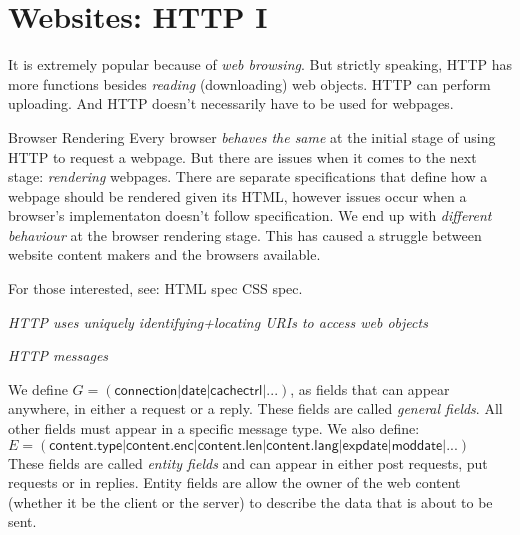 \section{Websites: HTTP I}


It is extremely popular because of \textit{web browsing}. 
But strictly speaking, HTTP has more 
functions besides \textit{reading} (downloading) web objects. 
HTTP can perform uploading. And HTTP doesn't necessarily have 
to be used for webpages. 

\frmrule 


\frmrule 

\begin{sidenote}{Browser Rendering}
Every browser \textit{behaves the same} at the initial stage of 
using HTTP to request a webpage.
But there are issues when it comes to the next stage: \textit{rendering} webpages.  
There are separate specifications that define how a webpage should 
be rendered given its HTML, however issues occur when a browser's 
implementaton doesn't follow specification.
We end up with \textit{different behaviour} at the browser rendering stage.
This has caused a struggle between website content makers and the browsers available. 

For those interested, see: HTML spec CSS spec. 
\end{sidenote}

\frmrule 

\textit{HTTP uses uniquely identifying+locating URIs to \textit{access web objects}}


\frmrule 

\textit{HTTP messages}

We define $G = (\mathsf{connection} | \mathsf{date} | \mathsf{cachectrl} | ... )$, 
as fields that can appear anywhere, in either a request or a reply. 
These fields are called \textit{general fields}. All other fields must appear in a specific message type. 
We also define:\\
$E = (\mathsf{content.type} | \mathsf{content.enc} | \mathsf{content.len} 
| \mathsf{content.lang} | \mathsf{expdate} | \mathsf{moddate} | ...)$ \\
These fields are called \textit{entity fields} 
and can appear in either post requests, put requests or in 
replies. Entity fields are allow the owner of the web content (whether it be 
the client or the server) to describe the data that is about to be sent.

